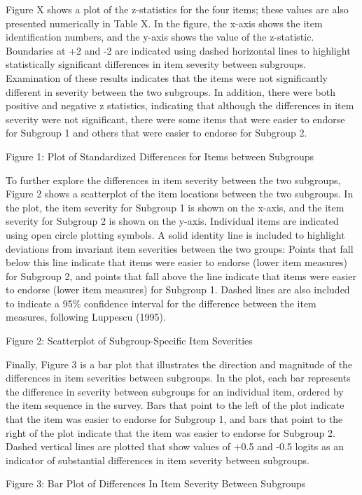 \documentclass[
  letterpaper,
  DIV=11,
  numbers=noendperiod]{scrreport}
\begin{document}
Figure X shows a plot of the z-statistics for the four items; these
values are also presented numerically in Table X. In the figure, the
x-axis shows the item identification numbers, and the y-axis shows the
value of the z-statistic. Boundaries at +2 and -2 are indicated using
dashed horizontal lines to highlight statistically significant
differences in item severity between subgroups. Examination of these
results indicates that the items were not significantly different in
severity between the two subgroups. In addition, there were both
positive and negative z statistics, indicating that although the
differences in item severity were not significant, there were some items
that were easier to endorse for Subgroup 1 and others that were easier
to endorse for Subgroup 2.

Figure 1: Plot of Standardized Differences for Items between Subgroups

To further explore the differences in item severity between the two
subgroups, Figure 2 shows a scatterplot of the item locations between
the two subgroups. In the plot, the item severity for Subgroup 1 is
shown on the x-axis, and the item severity for Subgroup 2 is shown on
the y-axis. Individual items are indicated using open circle plotting
symbols. A solid identity line is included to highlight deviations from
invariant item severities between the two groups: Points that fall below
this line indicate that items were easier to endorse (lower item
measures) for Subgroup 2, and points that fall above the line indicate
that items were easier to endorse (lower item measures) for Subgroup 1.
Dashed lines are also included to indicate a 95\% confidence interval
for the difference between the item measures, following Luppescu (1995).

Figure 2: Scatterplot of Subgroup-Specific Item Severities

Finally, Figure 3 is a bar plot that illustrates the direction and
magnitude of the differences in item severities between subgroups. In
the plot, each bar represents the difference in severity between
subgroups for an individual item, ordered by the item sequence in the
survey. Bars that point to the left of the plot indicate that the item
was easier to endorse for Subgroup 1, and bars that point to the right
of the plot indicate that the item was easier to endorse for Subgroup 2.
Dashed vertical lines are plotted that show values of +0.5 and -0.5
logits as an indicator of substantial differences in item severity
between subgroups.

Figure 3: Bar Plot of Differences In Item Severity Between Subgroups
\end{document}
